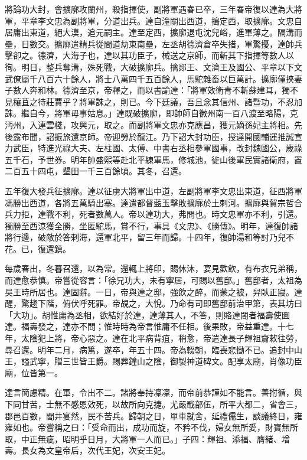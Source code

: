 \begin{pinyinscope}
將論功大封，會擴廓攻蘭州，殺指揮使，副將軍遇春已卒，三年春帝復以達為大將軍，平章李文忠為副將軍，分道出兵。達自潼關出西道，搗定西，取擴廓。文忠自居庸出東道，絕大漠，追元嗣主。達至定西，擴廓退屯沈兒峪，進軍薄之。隔溝而壘，日數交。擴廓遣精兵從間道劫東南壘，左丞胡德濟倉卒失措，軍驚擾，達帥兵擊卻之。德濟，大海子也，達以其功臣子，械送之京師，而斬其下指揮等數人以徇。明日，整兵奪溝，殊死戰，大破擴廓兵。擒郯王、文濟王及國公、平章以下文武僚屬千八百六十餘人，將士八萬四千五百餘人，馬駝雜畜以巨萬計。擴廓僅挾妻子數人奔和林。德濟至京，帝釋之，而以書諭達：「將軍效衛青不斬蘇建耳，獨不見穰苴之待莊賈乎？將軍誅之，則已。今下廷議，吾且念其信州、諸暨功，不忍加誅。繼自今，將軍毋事姑息。」達既破擴廓，即帥師自徽州南一百八渡至略陽，克沔州，入連雲棧，攻興元，取之。而副將軍文忠亦克應昌，獲元嫡孫妃主將相。先後露布聞，詔振旅還京師。帝迎勞於龍江。乃下詔大封功臣，授達開國輔運推誠宣力武臣，特進光祿大夫、左柱國、太傅、中書右丞相參軍國事，改封魏國公，歲祿五千石，予世券。明年帥盛熙等赴北平練軍馬，修城池，徙山後軍民實諸衛府，置二百五十四屯，墾田一千三百餘頃。其冬，召還。

五年復大發兵征擴廓。達以征虜大將軍出中道，左副將軍李文忠出東道，征西將軍馮勝出西道，各將五萬騎出塞。達遣都督藍玉擊敗擴廓於土刺河。擴廓與賀宗哲合兵力拒，達戰不利，死者數萬人。帝以達功大，弗問也。時文忠軍亦不利，引還。獨勝至西涼獲全勝，坐匿駝馬，賞不行，事具《文忠》、《勝傳》。明年，達復帥諸將行邊，破敵於答剌海，還軍北平，留三年而歸。十四年，復帥湯和等討乃兒不花。已，復還鎮。

每歲春出，冬暮召還，以為常。還輒上將印，賜休沐，宴見歡飲，有布衣兄弟稱，而達愈恭慎。帝嘗從容言：「徐兄功大，未有寧居，可賜以舊邸。」舊邸者，太祖為吳王時所居也。達固辭。一日，帝與達之邸，強飲之醉，而蒙之被，舁臥正寢。達醒，驚趨下階，俯伏呼死罪。帝覘之，大悅。乃命有司即舊邸前治甲第，表其坊曰「大功」。胡惟庸為丞相，欲結好於達，達薄其人，不答，則賂達閽者福壽使圖達。福壽發之，達亦不問；惟時時為帝言惟庸不任相。後果敗，帝益重達。十七年，太陰犯上將，帝心惡之。達在北平病背疽，稍愈，帝遣達長子輝祖齎敕往勞，尋召還。明年二月，病篤，遂卒，年五十四。帝為輟朝，臨喪悲慟不已。追封中山王，謚武寧，贈三世皆王爵。賜葬鐘山之陰，御製神道碑文。配享太廟，肖像功臣廟，位皆第一。

達言簡慮精。在軍，令出不二。諸將奉持凜凜，而帝前恭謹如不能言。善拊循，與下同甘苦，士無不感恩效死，以故所向克捷。尤嚴戢部伍，所平大都二，省會三，郡邑百數，閭井宴然，民不苦兵。歸朝之日，單車就舍，延禮儒生，談議終日，雍雍如也。帝嘗稱之曰：「受命而出，成功而旋，不矜不伐，婦女無所愛，財寶無所取，中正無疵，昭明乎日月，大將軍一人而已。」子四：輝祖、添福、膺緒、增壽。長女為文皇帝后，次代王妃，次安王妃。


\end{pinyinscope}
